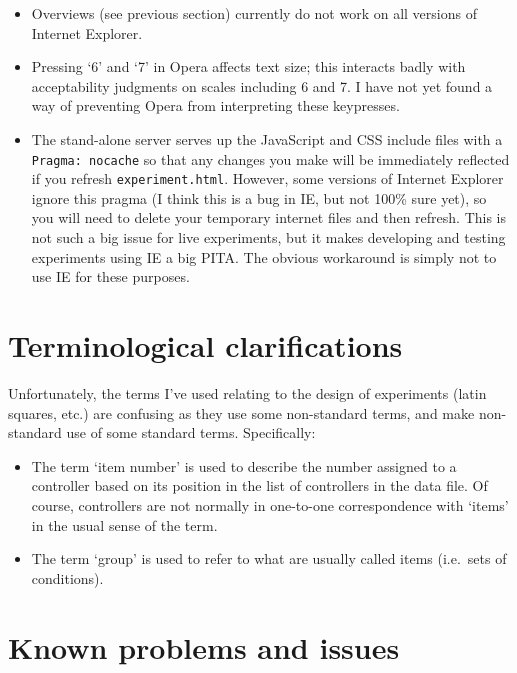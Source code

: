 \documentclass[]{article}
\begin{document}
\begin{itemize}
\item
  Overviews (see previous section) currently do not work on all versions
  of Internet Explorer.
\item
  Pressing `6' and `7' in Opera affects text size; this interacts badly
  with acceptability judgments on scales including 6 and 7. I have not
  yet found a way of preventing Opera from interpreting these
  keypresses.
\item
  The stand-alone server serves up the JavaScript and CSS include files
  with a \texttt{Pragma:\ nocache} so that any changes you make will be
  immediately reflected if you refresh \texttt{experiment.html}.
  However, some versions of Internet Explorer ignore this pragma (I
  think this is a bug in IE, but not 100\% sure yet), so you will need
  to delete your temporary internet files and then refresh. This is not
  such a big issue for live experiments, but it makes developing and
  testing experiments using IE a big PITA. The obvious workaround is
  simply not to use IE for these purposes.
\end{itemize}

\section{Terminological
clarifications}\label{terminological-clarifications}

Unfortunately, the terms I've used relating to the design of experiments
(latin squares, etc.) are confusing as they use some non-standard terms,
and make non-standard use of some standard terms. Specifically:

\begin{itemize}
\item
  The term `item number' is used to describe the number assigned to a
  controller based on its position in the list of controllers in the
  data file. Of course, controllers are not normally in one-to-one
  correspondence with `items' in the usual sense of the term.
\item
  The term `group' is used to refer to what are usually called items
  (i.e.~sets of conditions).
\end{itemize}

\section{Known problems and issues}\label{known-problems-and-issues}
\end{document}
